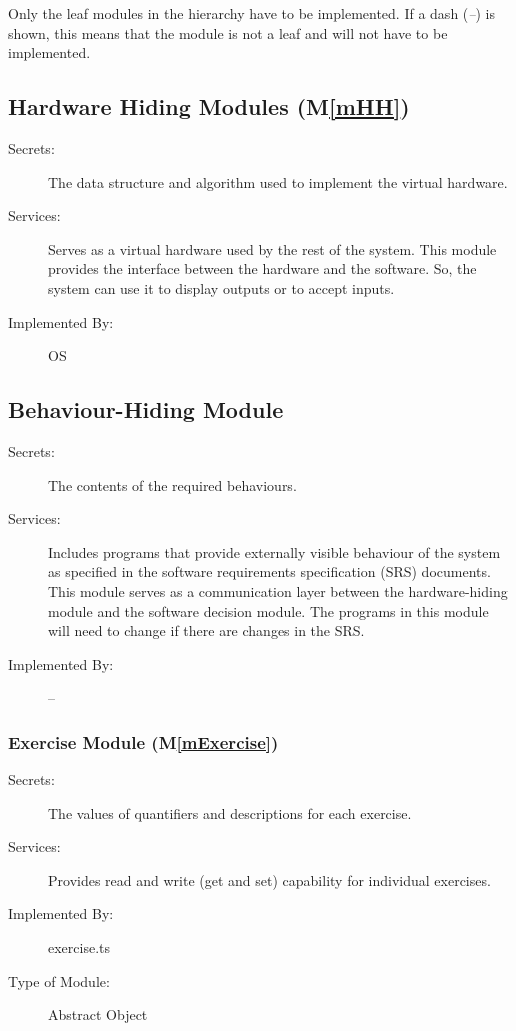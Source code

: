 \documentclass[12pt, titlepage]{article}
\newcommand{\mref}[1]{M\ref{#1}}
\begin{document}
Only the leaf modules in the hierarchy have to be implemented. If a dash
(\emph{--}) is shown, this means that the module is not a leaf and will not have
to be implemented.

\subsection{Hardware Hiding Modules (\mref{mHH})}

\begin{description}
\item[Secrets:]The data structure and algorithm used to implement the virtual
  hardware.
\item[Services:]Serves as a virtual hardware used by the rest of the
  system. This module provides the interface between the hardware and the
  software. So, the system can use it to display outputs or to accept inputs.
\item[Implemented By:] OS
\end{description}

\subsection{Behaviour-Hiding Module}

\begin{description}
\item[Secrets:]The contents of the required behaviours.
\item[Services:]Includes programs that provide externally visible behaviour of
  the system as specified in the software requirements specification (SRS)
  documents. This module serves as a communication layer between the
  hardware-hiding module and the software decision module. The programs in this
  module will need to change if there are changes in the SRS.
\item[Implemented By:] --
\end{description}

\subsubsection{Exercise Module (\mref{mExercise})}

\begin{description}
\item[Secrets:] The values of quantifiers and descriptions for each exercise.
\item[Services:] Provides read and write (get and set) capability for individual exercises.
\item[Implemented By:] exercise.ts
\item[Type of Module:] Abstract Object
\end{description}
\end{document}
